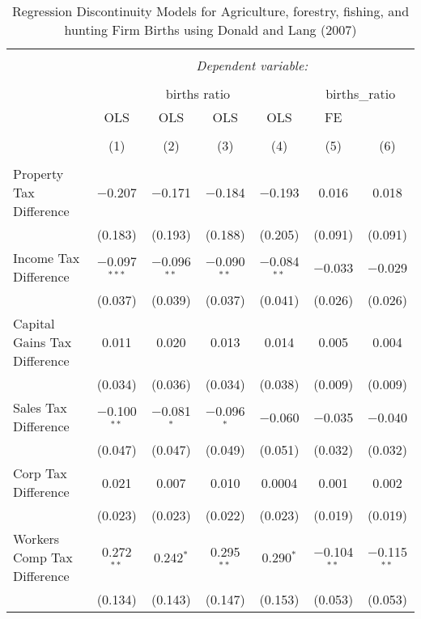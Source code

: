 
\begin{table}[!htbp] \centering 
  \caption{Regression Discontinuity Models for  Agriculture, forestry, fishing, and hunting Firm Births using Donald and Lang (2007)} 
  \label{} 
\begin{tabular}{@{\extracolsep{5pt}}lcccccc} 
\\[-1.8ex]\hline 
\hline \\[-1.8ex] 
 & \multicolumn{6}{c}{\textit{Dependent variable:}} \\ 
\cline{2-7} 
\\[-1.8ex] & \multicolumn{4}{c}{births ratio} & \multicolumn{2}{c}{births\_ratio} \\ 
 & OLS & OLS & OLS & OLS & FE &  \\ 
\\[-1.8ex] & (1) & (2) & (3) & (4) & (5) & (6)\\ 
\hline \\[-1.8ex] 
 Property Tax Difference & $-$0.207 & $-$0.171 & $-$0.184 & $-$0.193 & 0.016 & 0.018 \\ 
  & (0.183) & (0.193) & (0.188) & (0.205) & (0.091) & (0.091) \\ 
  Income Tax Difference & $-$0.097$^{***}$ & $-$0.096$^{**}$ & $-$0.090$^{**}$ & $-$0.084$^{**}$ & $-$0.033 & $-$0.029 \\ 
  & (0.037) & (0.039) & (0.037) & (0.041) & (0.026) & (0.026) \\ 
  Capital Gains Tax Difference & 0.011 & 0.020 & 0.013 & 0.014 & 0.005 & 0.004 \\ 
  & (0.034) & (0.036) & (0.034) & (0.038) & (0.009) & (0.009) \\ 
  Sales Tax Difference & $-$0.100$^{**}$ & $-$0.081$^{*}$ & $-$0.096$^{*}$ & $-$0.060 & $-$0.035 & $-$0.040 \\ 
  & (0.047) & (0.047) & (0.049) & (0.051) & (0.032) & (0.032) \\ 
  Corp Tax Difference & 0.021 & 0.007 & 0.010 & 0.0004 & 0.001 & 0.002 \\ 
  & (0.023) & (0.023) & (0.022) & (0.023) & (0.019) & (0.019) \\ 
  Workers Comp Tax Difference & 0.272$^{**}$ & 0.242$^{*}$ & 0.295$^{**}$ & 0.290$^{*}$ & $-$0.104$^{**}$ & $-$0.115$^{**}$ \\ 
  & (0.134) & (0.143) & (0.147) & (0.153) & (0.053) & (0.053) \\ 

\end{tabular}
\end{table}
